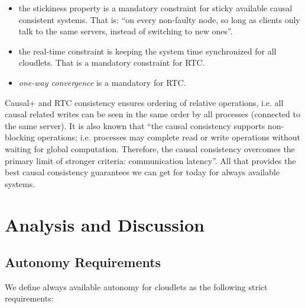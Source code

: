 \documentclass[conference]{IEEEtran}
\begin{document}
\begin{itemize}
  \item the stickiness property is a mandatory constraint for sticky available
    causal consistent systems. That is: ``on every non-faulty node, so long
    as clients only talk to the same servers, instead of switching to new
    ones''\cite{b4}.
  \item the real-time constraint is keeping the system time synchronized for
    all cloudlets. That is a mandatory constraint for RTC.
  \item \textit{one-way convergence}\cite{b2} is a mandatory for RTC.
\end{itemize}

Causal+ and RTC consistency ensures ordering of relative operations, i.e. all
causal related writes can be seen in the same order by all processes
(connected to the same server). It is also known that ``the causal consistency
supports non-blocking operations; i.e. processes may complete read or write
operations without waiting for global computation. Therefore, the causal
consistency overcomes the primary limit of stronger criteria: communication
latency''\cite{b6}. All that provides the best causal consistency guarantees we
can get for today for always available systems.

\section{Analysis and Discussion}

\subsection{Autonomy Requirements}

We define always available autonomy for cloudlets as the following strict
requirements:
\end{document}
